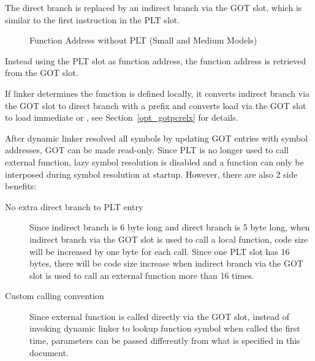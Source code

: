 The direct branch is replaced by an indirect branch via the GOT slot,
which is similar to the first instruction in the PLT slot.

\begin{figure}[H]
\Hrule
\caption{Function Address without PLT (Small and Medium Models)}
\begin{center}
\small{}
\end{center}
\Hrule
\end{figure}

Instead using the PLT slot as function address, the function address
is retrieved from the GOT slot.

If linker determines the function is defined locally, it converts
indirect branch via the GOT slot to direct branch with a 
prefix and converts load via the GOT slot to load immediate or
, see Section~\ref{opt_gotpcrelx} for details.

After dynamic linker resolved all symbols by updating GOT entries with
symbol addresses, GOT can be made read-only.  Since PLT is no longer
used to call external function, lazy symbol resolution is disabled and
a function can only be interposed during symbol resolution at startup.
However, there are also 2 side benefits:

\begin{description}
\item[No extra direct branch to PLT entry]  Since indirect branch is 6
  byte long and direct branch is 5 byte long, when indirect branch via
  the GOT slot is used to call a local function, code size will be
  increased by one byte for each call.  Since one PLT slot has 16 bytes,
  there will be code size increase when indirect branch via the GOT slot
  is used to call an external function more than 16 times.
\item[Custom calling convention]  Since external function is called
  directly via the GOT slot, instead of invoking dynamic linker to
  lookup function symbol when called the first time, parameters can be
  passed differently from what is specified in this document.
\end{description}

